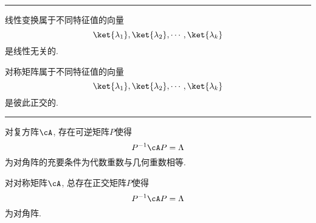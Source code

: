 \documentclass{ctexart}
\begin{document}
\hrule

\begin{paracol}{2}
    
    \begin{theorem}
        线性变换属于不同特征值的向量
        \[ \ket{\lambda_1}, \ket{\lambda_2}, \cdots, \ket{\lambda_k} \]
        是线性无关的.
    \end{theorem}

    \switchcolumn

    \begin{theorem}
        对称矩阵属于不同特征值的向量
        \[ \ket{\lambda_1}, \ket{\lambda_2}, \cdots, \ket{\lambda_k} \]
        是彼此正交的.
    \end{theorem}

\end{paracol}

\hrule

\begin{paracol}{2}

    \begin{theorem}
        对复方阵$\cA$, 存在可逆矩阵$P$使得
        \[ P^{-1}\cA P = \Lambda \]
        为对角阵的充要条件为代数重数与几何重数相等.
    \end{theorem}
    
    \switchcolumn

    \begin{theorem}
        对对称矩阵$\cA$, 总存在正交矩阵$P$使得
        \[ P^{-1}\cA P = \Lambda \]
        为对角阵.
    \end{theorem}

\end{paracol}

\end{document}
